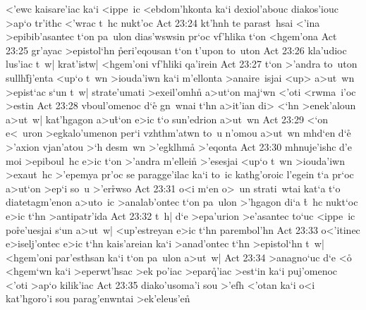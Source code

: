 <'ewc
kaisare'iac
ka`i
<ippe~ic
<ebdom'hkonta
ka`i
dexiol'abouc
diakos'iouc
>ap`o
tr'ithc
<'wrac
t~hc
nukt'oc\bibvsend
\vs Act 23:24
kt'hnh
te
parast~hsai
<'ina
>epibib'asantec
t`on
pa~ulon
dias'wswsin
pr`oc
vf'hlika
t`on
<hgem'ona\bibvsend
\vs Act 23:25
gr'ayac
>epistol`hn
\r{p}eri'eqousan
t`on
t'upon
to~uton\bibvsend
\vs Act 23:26
kla'udioc
lus'iac
t~w|
krat'istw|
<hgem'oni
vf'hliki
qa'irein\bibvsend
\vs Act 23:27
t`on
>'andra
to~uton
sullh\r{f}j'enta
<up`o
t~wn
>iouda'iwn
ka`i
m'ellonta
>anaire~isjai
<up>
a>ut~wn
>epist`ac
s`un
t~w|
strate'umati
>exeil'omhn\r{}
a>ut`on
maj`wn
<'oti
<rwma~i'oc
>estin\bibvsend
\vs Act 23:28
vboul'omenoc
d`e\r{}
gn~wnai
t`hn
a>it'ian
di>
<`hn
>enek'aloun
a>ut~w|
kat'hgagon
a>u\r{t}`on
e>ic
t`o
sun'edrion
a>ut~wn\bibvsend
\vs Act 23:29
<`on
e<~uron
>egkalo'umenon
per`i
vzhthm'atwn
to~u
n'omou
a>ut~wn
mhd`en
d`e\r{}
>'axion
vjan'atou
>`h
desm~wn
>'egklhma\r{}
>'eqonta\bibvsend
\vs Act 23:30
mhnuje'ishc
d'e
moi
>epiboul~hc
e>ic
t`on
>'andra
m'ellein\r{}
>'esesjai
<up`o
t~wn
>iouda'iwn
>exaut~hc
>'epemya
pr'oc
se
paragge'ilac
ka`i
to~ic
kathg'oroic
l'egein
t`a
pr`oc
a>ut`on
>ep`i
so~u
>'er\r{r}wso\bibvsend
{}
\vs Act 23:31
o<i
m`en
o>~un
strati~wtai
kat`a
t`o
diatetagm'enon
a>uto~ic
>analab'ontec
t`on
pa~ulon
>'hgagon
di`a
\r{t}~hc
nukt`oc
e>ic
t`hn
>antipatr'ida\bibvsend
\vs Act 23:32
t~h|
d`e
>epa'urion
>e'asantec
to`uc
<ippe~ic
po\r{r}e'uesjai
s`un
a>ut~w|
<up'estreyan
e>ic
t`hn
parembol'hn\bibvsend
\vs Act 23:33
o<'itinec
e>iselj'ontec
e>ic
t`hn
kais'areian
ka`i
>anad'ontec
t`hn
>epistol`hn
t~w|
<hgem'oni
par'esthsan
ka`i
t`on
pa~ulon
a>ut~w|\bibvsend
\vs Act 23:34
>anagno`uc
d`e
<o\r{}
<hgem`wn
ka`i
>eperwt'hsac
>ek
po'iac
>epar\r{q}'iac
>est`in
ka`i
puj'omenoc
<'oti
>ap`o
kilik'iac\bibvsend
\vs Act 23:35
diako'usoma'i
sou
>'efh
<'otan
ka`i
o<i
kat'hgoro'i
sou
parag'enwntai
>ek'eleus'en\r{}
